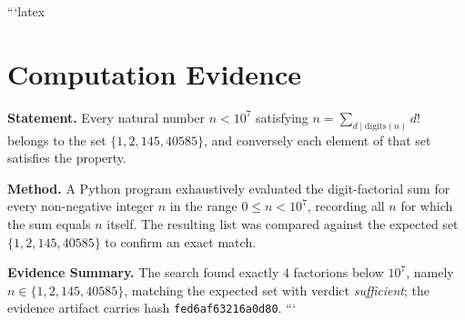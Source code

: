 ```latex
\section*{Computation Evidence}

\textbf{Statement.} Every natural number $n < 10^{7}$ satisfying $n = \sum_{d \mid \text{digits}(n)} d!$ belongs to the set $\{1, 2, 145, 40585\}$, and conversely each element of that set satisfies the property.

\textbf{Method.} A Python program exhaustively evaluated the digit-factorial sum for every non-negative integer $n$ in the range $0 \le n < 10^{7}$, recording all $n$ for which the sum equals $n$ itself. The resulting list was compared against the expected set $\{1, 2, 145, 40585\}$ to confirm an exact match.

\textbf{Evidence Summary.} The search found exactly $4$ factorions below $10^{7}$, namely $n \in \{1, 2, 145, 40585\}$, matching the expected set with verdict \emph{sufficient}; the evidence artifact carries hash \texttt{fed6af63216a0d80}.
```